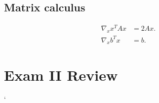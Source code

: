 \documentclass{amsbook}
\theoremstyle{plain}
\numberwithin{section}{chapter}
\numberwithin{equation}{chapter}
\theoremstyle{definition}
\theoremstyle{remark}
\newcommand{\bee}{\begin{equation}\begin{aligned}}
\newcommand{\eee}{\end{aligned}\end{equation}}
\begin{document}
\subsection{Matrix calculus}

\bee
\nabla_x x^TAx &= 2Ax.\\
\nabla_x b^Tx &= b.
\eee


\section{Exam II Review}

	`

















\appendix
%

\backmatter


\printindex
\end{document}
